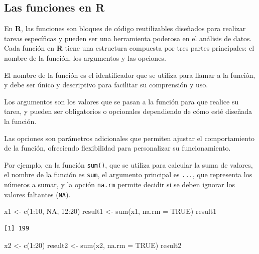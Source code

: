 \documentclass[
  letterpaper,
]{scrbook}
\newenvironment{Shaded}{\begin{snugshade}}{\end{snugshade}}
\newcommand{\AttributeTok}[1]{\textcolor[rgb]{0.40,0.45,0.13}{#1}}
\newcommand{\ConstantTok}[1]{\textcolor[rgb]{0.56,0.35,0.01}{#1}}
\newcommand{\DecValTok}[1]{\textcolor[rgb]{0.68,0.00,0.00}{#1}}
\newcommand{\FunctionTok}[1]{\textcolor[rgb]{0.28,0.35,0.67}{#1}}
\newcommand{\NormalTok}[1]{\textcolor[rgb]{0.00,0.23,0.31}{#1}}
\newcommand{\OtherTok}[1]{\textcolor[rgb]{0.00,0.23,0.31}{#1}}
\newcommand{\SpecialCharTok}[1]{\textcolor[rgb]{0.37,0.37,0.37}{#1}}
\begin{document}
\hypertarget{las-funciones-en-r}{%
\subsection{Las funciones en R}\label{las-funciones-en-r}}

En \textbf{R}, las funciones son bloques de código reutilizables
diseñados para realizar tareas específicas y pueden ser una herramienta
poderosa en el análisis de datos. Cada función en \textbf{R} tiene una
estructura compuesta por tres partes principales: el nombre de la
función, los argumentos y las opciones.

El nombre de la función es el identificador que se utiliza para llamar a
la función, y debe ser único y descriptivo para facilitar su comprensión
y uso.

Los argumentos son los valores que se pasan a la función para que
realice su tarea, y pueden ser obligatorios o opcionales dependiendo de
cómo esté diseñada la función.

Las opciones son parámetros adicionales que permiten ajustar el
comportamiento de la función, ofreciendo flexibilidad para personalizar
su funcionamiento.

Por ejemplo, en la función \texttt{sum()}, que se utiliza para calcular
la suma de valores, el nombre de la función es \texttt{sum}, el
argumento principal es \texttt{...}, que representa los números a sumar,
y la opción \texttt{na.rm} permite decidir si se deben ignorar los
valores faltantes (\texttt{NA}).

\begin{Shaded}
\begin{Highlighting}[]
\NormalTok{x1 }\OtherTok{\textless{}{-}} \FunctionTok{c}\NormalTok{(}\DecValTok{1}\SpecialCharTok{:}\DecValTok{10}\NormalTok{, }\ConstantTok{NA}\NormalTok{, }\DecValTok{12}\SpecialCharTok{:}\DecValTok{20}\NormalTok{)}
\NormalTok{result1 }\OtherTok{\textless{}{-}} \FunctionTok{sum}\NormalTok{(x1, }\AttributeTok{na.rm =} \ConstantTok{TRUE}\NormalTok{)}
\NormalTok{result1}
\end{Highlighting}
\end{Shaded}

\begin{verbatim}
[1] 199
\end{verbatim}

\begin{Shaded}
\begin{Highlighting}[]
\NormalTok{x2 }\OtherTok{\textless{}{-}} \FunctionTok{c}\NormalTok{(}\DecValTok{1}\SpecialCharTok{:}\DecValTok{20}\NormalTok{)}
\NormalTok{result2 }\OtherTok{\textless{}{-}} \FunctionTok{sum}\NormalTok{(x2, }\AttributeTok{na.rm =} \ConstantTok{TRUE}\NormalTok{)}
\NormalTok{result2}
\end{Highlighting}
\end{Shaded}
\end{document}
